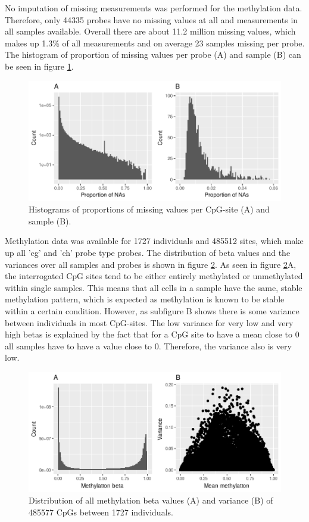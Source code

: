 \documentclass[a4paper,12pt,twoside,openright]{article}
\begin{document}
No imputation of missing measurements was performed for the methylation data. Therefore, only 44335 probes have no missing values at all and measurements in all samples available. Overall there are about 11.2 million missing values, which makes up 1.3\% of all measurements and on average 23 samples missing per probe. The histogram of proportion of missing values per probe (A) and sample (B) can be seen in figure \ref{fig:meth.na.hist}.

\begin{figure}[tb]
	\includegraphics[scale = 1, keepaspectratio = true]{../figures/meth_na_hist}  
	\caption{Histograms of proportions of missing values per CpG-site (A) and sample (B).}
    \label{fig:meth.na.hist}
\end{figure}

Methylation data was available for 1727 individuals and 485512 sites, which make up all 'cg' and 'ch' probe type probes. The distribution of beta values and the variances over all samples and probes is shown in figure \ref{fig:meth.raw.hist.var}. As seen in figure \ref{fig:meth.raw.hist.var}A, the interrogated CpG sites tend to be either entirely methylated or unmethylated within single samples. This means that all cells in a sample have the same, stable methylation pattern, which is expected as methylation is known to be stable within a certain condition\cite{}. However, as subfigure B shows there is some variance between individuals in most CpG-sites. The low variance for very low and very high betas is explained by the fact that for a CpG site to have a mean close to 0 all samples have to have a value close to 0. Therefore, the variance also is very low.

 
\begin{figure}[tb]
	\includegraphics[scale = 1, keepaspectratio = true]{../figures/meth_raw_hist_var}  
	\caption{Distribution of all methylation beta values (A) and variance (B) of 485577 CpGs between 1727 individuals.}
    \label{fig:meth.raw.hist.var}
\end{figure}
\end{document}
